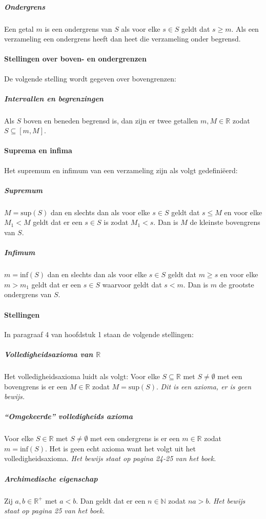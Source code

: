 \subparagraph{Ondergrens} Een getal $m$ is een ondergrens van $S$ als voor elke $s \in S$ geldt dat $s \geq m$. Als een verzameling een ondergrens heeft dan heet die verzameling onder begrensd.

\paragraph{Stellingen over boven- en ondergrenzen} De volgende stelling wordt gegeven over bovengrenzen:

\subparagraph{Intervallen en begrenzingen} Als $S$ boven en beneden begrensd is, dan zijn er twee getallen $m,M\in\mathbb{R}$ zodat $S\subseteq [m,M]$.

\paragraph{Suprema en infima} Het supremum en infimum van een verzameling zijn als volgt gedefiniëerd:

\subparagraph{Supremum} $M=\text{sup}(S)$ dan en slechts dan als voor elke $s \in S$ geldt dat $s \leq M$ en voor elke $M_{1}<M$ geldt dat er een $s \in S$ is zodat $M_{1}<s$. Dan is $M$ de kleinste bovengrens van $S$.

\subparagraph{Infimum} $m=\text{inf}(S)$ dan en slechts dan als voor elke $s \in S$ geldt dat $m \geq s$ en voor elke $m>m_{1}$ geldt dat er een $s \in S$ waarvoor geldt dat $s<m$. Dan is $m$ de grootste ondergrens van $S$.

\paragraph{Stellingen} In paragraaf 4 van hoofdstuk 1 staan de volgende stellingen:

\subparagraph{Volledigheidsaxioma van $\mathbb{R}$} Het volledigheidsaxioma luidt als volgt: Voor elke $S\subseteq\mathbb{R}$ met $S\neq\emptyset$ met een bovengrens is er een $M\in\mathbb{R}$ zodat $M=\text{sup}(S)$. \textit{Dit is een axioma, er is geen bewijs.}

\subparagraph{``Omgekeerde'' volledigheids \bq axioma\eq} Voor elke $S\in\mathbb{R}$ met $S\neq\emptyset$ met een ondergrens is er een $m\in\mathbb{R}$ zodat $m=\text{inf}(S)$. Het is geen echt axioma want het volgt uit het volledigheidsaxioma. \textit{Het bewijs staat op pagina 24-25 van het boek.}

\subparagraph{Archimedische eigenschap} Zij $a,b\in\mathbb{R}^{+}$ met $a<b$. Dan geldt dat er een $n\in\mathbb{N}$ zodat $na>b$. \textit{Het bewijs staat op pagina 25 van het boek.}

